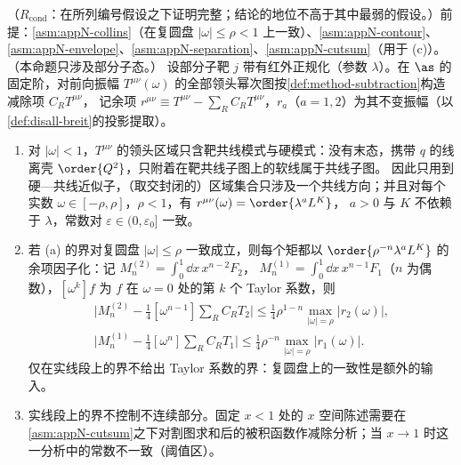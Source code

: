 \begin{proposition}\label{prop:disall-two-routes}
（$R_{\mathrm{cond}}$：在所列编号假设之下证明完整；结论的地位不高于其中最弱的假设。）前提：\cref{asm:appN-collins}（在复圆盘 $|\omega|\le\rho<1$ 上一致）、\cref{asm:appN-contour}、\cref{asm:appN-envelope}、\cref{asm:appN-separation}、\cref{asm:appN-cutsum}（用于 (c)）。（本命题只涉及部分子态。）
设部分子靶 $j$ 带有红外正规化（参数 $\lambda$）。在 $\as$ 的固定阶，对前向振幅 $T^{\mu\nu}(\omega)$ 的全部领头幂次图按\cref{def:method-subtraction}构造减除项 $C_RT^{\mu\nu}$，
记余项 $r^{\mu\nu}\equiv T^{\mu\nu}-\sum_RC_RT^{\mu\nu}$，$r_a$（$a=1,2$）为其不变振幅（以\cref{def:disall-breit}的投影提取）。
\begin{enumerate}[label=(\alph*),leftmargin=2em,itemsep=1pt,topsep=2pt]
\item 对 $|\omega|<1$，$T^{\mu\nu}$ 的领头区域只含靶共线模式与硬模式：没有末态，携带 $q$ 的线离壳 $\order{Q^2}$，只附着在靶共线子图上的软线属于共线子图。
因此只用到硬—共线近似子，（取交封闭的）区域集合只涉及一个共线方向；并且对每个实数 $\omega\in[-\rho,\rho]$，$\rho<1$，有 $r^{\mu\nu}(\omega)=\order{\lambda^aL^K}$，
$a>0$ 与 $K$ 不依赖于 $\lambda$，常数对 $\varepsilon\in(0,\varepsilon_0]$ 一致。
\item 若 (a) 的界对复圆盘 $|\omega|\le\rho$ 一致成立，则每个矩都以 $\order{\rho^{-n}\lambda^aL^K}$ 的余项因子化：记 $M^{(2)}_n=\int_0^1\dd x\,x^{n-2}F_2$，
$M^{(1)}_n=\int_0^1\dd x\,x^{n-1}F_1$（$n$ 为偶数），$[\omega^k]f$ 为 $f$ 在 $\omega=0$ 处的第 $k$ 个 Taylor 系数，则
\begin{equation}\label{eq:disall-cauchy}
\begin{gathered}
\Big|M^{(2)}_n-\tfrac14[\omega^{n-1}]\textstyle\sum_RC_RT_2\Big|\le\tfrac14\rho^{1-n}\max_{|\omega|=\rho}|r_2(\omega)|,\\
\Big|M^{(1)}_n-\tfrac14[\omega^{n}]\textstyle\sum_RC_RT_1\Big|\le\tfrac14\rho^{-n}\max_{|\omega|=\rho}|r_1(\omega)|.
\end{gathered}
\end{equation}
仅在实线段上的界不给出 Taylor 系数的界：复圆盘上的一致性是额外的输入。
\item 实线段上的界不控制不连续部分。固定 $x<1$ 处的 $x$ 空间陈述需要在\cref{asm:appN-cutsum}之下对割图求和后的被积函数作减除分析；当 $x\to1$ 时这一分析中的常数不一致（阈值区）。
\end{enumerate}
\end{proposition}

